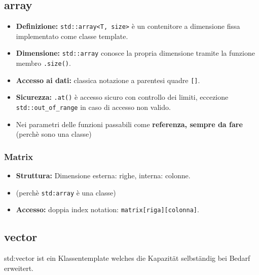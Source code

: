 \subsection{array}
\begin{itemize}
\item \textbf{Definizione:} \texttt{std::array<T, size>} è un contenitore a dimensione 
fissa implementato come classe template.
\item \textbf{Dimensione:} \texttt{std::array} conosce la propria dimensione tramite la 
funzione membro \texttt{.size()}.
\item \textbf{Accesso ai dati:} classica notazione a parentesi quadre \texttt{[]}.
\item \textbf{Sicurezza:} \texttt{.at()} è accesso sicuro con controllo dei limiti, eccezione \lstinline|std::out_of_range| in caso di accesso non valido.
\item Nei parametri delle funzioni passabili come \textbf{\color{red}referenza, sempre da fare} (perchè sono una classe)
\end{itemize}

\example{}
\vspace{-1em}

\subsubsection{Matrix}
\begin{itemize}
\item \textbf{Struttura:} Dimensione esterna: righe, interna: colonne.
\item {} 
(perchè \texttt{std:array} è una classe)
\item \textbf{Accesso:} doppia index notation: \texttt{matrix[riga][colonna]}.
\end{itemize}

\example{}


\subsection{vector}
std:vector ist ein Klassentemplate welches die Kapazität selbständig bei Bedarf erweitert.
